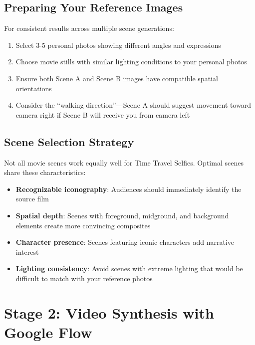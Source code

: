 \subsection{Preparing Your Reference Images}

For consistent results across multiple scene generations:

\begin{enumerate}
\item Select 3-5 personal photos showing different angles and expressions
\item Choose movie stills with similar lighting conditions to your personal photos
\item Ensure both Scene A and Scene B images have compatible spatial orientations
\item Consider the ``walking direction''—Scene A should suggest movement toward camera right if Scene B will receive you from camera left
\end{enumerate}

\subsection{Scene Selection Strategy}

Not all movie scenes work equally well for Time Travel Selfies. Optimal scenes share these characteristics:

\begin{itemize}
\item \textbf{Recognizable iconography}: Audiences should immediately identify the source film
\item \textbf{Spatial depth}: Scenes with foreground, midground, and background elements create more convincing composites
\item \textbf{Character presence}: Scenes featuring iconic characters add narrative interest
\item \textbf{Lighting consistency}: Avoid scenes with extreme lighting that would be difficult to match with your reference photos
\end{itemize}

\section{Stage 2: Video Synthesis with Google Flow}
\label{sec:google-flow}

